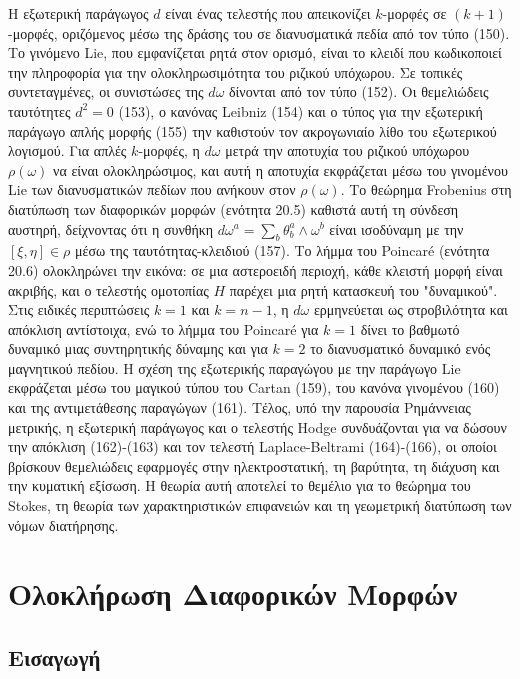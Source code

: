 \documentclass[12pt]{article}
\begin{document}
Η εξωτερική παράγωγος $d$ είναι ένας τελεστής που απεικονίζει $k$-μορφές σε $(k+1)$-μορφές, οριζόμενος μέσω της δράσης του σε διανυσματικά πεδία από τον τύπο (150). Το γινόμενο Lie, που εμφανίζεται ρητά στον ορισμό, είναι το κλειδί που κωδικοποιεί την πληροφορία για την ολοκληρωσιμότητα του ριζικού υπόχωρου. Σε τοπικές συντεταγμένες, οι συνιστώσες της $d\omega$ δίνονται από τον τύπο (152). Οι θεμελιώδεις ταυτότητες $d^2 = 0$ (153), ο κανόνας Leibniz (154) και ο τύπος για την εξωτερική παράγωγο απλής μορφής (155) την καθιστούν τον ακρογωνιαίο λίθο του εξωτερικού λογισμού. Για απλές $k$-μορφές, η $d\omega$ μετρά την αποτυχία του ριζικού υπόχωρου $\rho(\omega)$ να είναι ολοκληρώσιμος, και αυτή η αποτυχία εκφράζεται μέσω του γινομένου Lie των διανυσματικών πεδίων που ανήκουν στον $\rho(\omega)$. Το θεώρημα Frobenius στη διατύπωση των διαφορικών μορφών (ενότητα 20.5) καθιστά αυτή τη σύνδεση αυστηρή, δείχνοντας ότι η συνθήκη $d\omega^a = \sum_b \theta^a_b \wedge \omega^b$ είναι ισοδύναμη με την $[\xi, \eta] \in \rho$ μέσω της ταυτότητας-κλειδιού (157). Το λήμμα του Poincaré (ενότητα 20.6) ολοκληρώνει την εικόνα: σε μια αστεροειδή περιοχή, κάθε κλειστή μορφή είναι ακριβής, και ο τελεστής ομοτοπίας $H$ παρέχει μια ρητή κατασκευή του "δυναμικού". Στις ειδικές περιπτώσεις $k=1$ και $k=n-1$, η $d\omega$ ερμηνεύεται ως στροβιλότητα και απόκλιση αντίστοιχα, ενώ το λήμμα του Poincaré για $k=1$ δίνει το βαθμωτό δυναμικό μιας συντηρητικής δύναμης και για $k=2$ το διανυσματικό δυναμικό ενός μαγνητικού πεδίου. Η σχέση της εξωτερικής παραγώγου με την παράγωγο Lie εκφράζεται μέσω του μαγικού τύπου του Cartan (159), του κανόνα γινομένου (160) και της αντιμετάθεσης παραγώγων (161). Τέλος, υπό την παρουσία Ρημάννειας μετρικής, η εξωτερική παράγωγος και ο τελεστής Hodge συνδυάζονται για να δώσουν την απόκλιση (162)-(163) και τον τελεστή Laplace-Beltrami (164)-(166), οι οποίοι βρίσκουν θεμελιώδεις εφαρμογές στην ηλεκτροστατική, τη βαρύτητα, τη διάχυση και την κυματική εξίσωση. Η θεωρία αυτή αποτελεί το θεμέλιο για το θεώρημα του Stokes, τη θεωρία των χαρακτηριστικών επιφανειών και τη γεωμετρική διατύπωση των νόμων διατήρησης.

\section{Ολοκλήρωση Διαφορικών Μορφών}

\subsection{Εισαγωγή}
\end{document}
